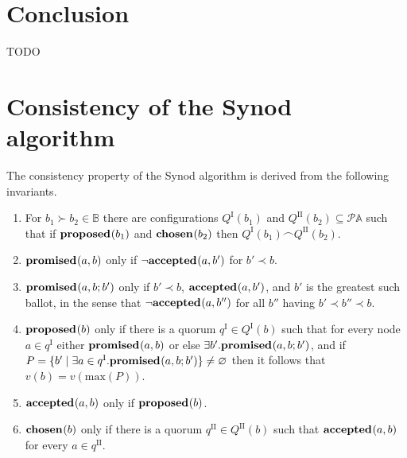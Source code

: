 \documentclass[journal]{IEEEtran}
\begin{document}




\section{Conclusion}

TODO


\pagebreak

\appendices
\section{Consistency of the Synod algorithm}
\label{synod-safety}

The consistency property of the Synod algorithm is derived from the following
invariants.

\begin{enumerate}

\item \label{synod-quorums} For $b_1 \succ b_2 \in \mathbb B$ there are
configurations $Q^\textrm{I}(b_1)$ and $Q^\textrm{II}(b_2) \subseteq \mathcal P
\mathbb A$ such that if $\mathbf{proposed}_{}(b_1)$ and $\mathbf{chosen}_{}(b_2)$ then
${Q^\textrm{I}(b_1) \frown Q^\textrm{II}(b_2)}$.

\item \label{synod-fprom} $\mathbf{promised}_{}(a,b)$ only if $\neg\mathbf{accepted}_{}(a,b')$ for ${b'
\prec b}$.

\item \label{synod-bprom} $\mathbf{promised}_{}(a,b;b')$ only if $b' \prec b$,
$\mathbf{accepted}_{}(a,b')$, and $b'$ is the greatest such ballot, in the sense that
$\neg\mathbf{accepted}_{}(a,b'')$ for all $b''$ having $b' \prec b'' \prec b$.

\item \label{synod-prop} $\mathbf{proposed}_{}(b)$ only if there is a quorum $q^\textrm{I}
\in Q^\textrm{I}(b)$ such that for every node $a \in q^\textrm{I}$ either
$\mathbf{promised}_{}(a,b)$ or else $\exists b'.  \mathbf{promised}_{}(a,b;b')$, and if ${P = \{ b'
\mid \exists a \in q^\textrm{I}. \mathbf{promised}_{}(a,b;b') \} \ne \varnothing}$ then
it follows that $v(b) = v(\mathrm{max}(P))$.

\item \label{synod-acc} $\mathbf{accepted}_{}(a,b)$ only if $\mathbf{proposed}_{}(b)$.

\item \label{synod-chosen} $\mathbf{chosen}_{}(b)$ only if there is a quorum
$q^\textrm{II} \in Q^\textrm{II}(b)$ such that $\mathbf{accepted}_{}(a,b)$ for every $a \in
q^\textrm{II}$.

\end{enumerate}
\end{document}
